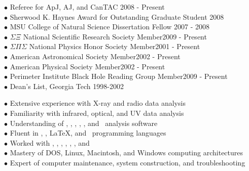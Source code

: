 \documentclass[12pt]{cv}
\begin{document}
\begin{llist}

$\bullet$ Referee for ApJ, AJ, and CanTAC \hfill 2008 - Present\\
$\bullet$ Sherwood K. Haynes Award for Outstanding Graduate Student \hfill 2008\\
$\bullet$ MSU College of Natural Science Dissertation Fellow \hfill 2007 - 2008\\
$\bullet$ $\Sigma \Xi$ National Scientific Research Society Member\hfill 2009 - Present\\
$\bullet$ $\Sigma \Pi \Sigma$ National Physics Honor Society Member\hfill 2001 - Present\\
$\bullet$ American Astronomical Society Member\hfill 2002 - Present\\
$\bullet$ American Physical Society Member\hfill 2002 - Present\\
$\bullet$ Perimeter Institute Black Hole Reading Group Member\hfill 2009 - Present\\
$\bullet$ Dean's List, Georgia Tech \hfill 1998-2002


$\bullet$ Extensive experience with X-ray and radio data analysis\\
$\bullet$ Familiarity with infrared, optical, and UV data analysis\\
$\bullet$ Understanding of \aips, \casa, \ciao, \iraf, \osa, and \sas\ analysis software\\
$\bullet$ Fluent in \html, \idl, \LaTeX, and \perl\ programming languages\\
$\bullet$ Worked with \clang, \flash, \fortran, \mysql, \python, \supmo, and \tcl\\
$\bullet$ Mastery of DOS, Linux, Macintosh, and Windows computing architectures\\
$\bullet$ Expert of computer maintenance, system construction, and troubleshooting




\end{llist}
\end{document}
